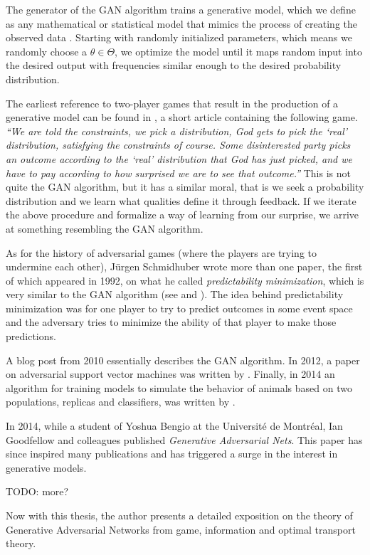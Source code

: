 The generator of the GAN algorithm trains a generative model, which we
define as any mathematical or statistical model that mimics the
process of creating the observed data \cite{ref:bishop}. Starting with
randomly initialized parameters, which means we randomly choose a
$\theta \in \Theta$, we optimize the model until it maps random input
into the desired output with frequencies similar enough to the desired
probability distribution.

The earliest reference to two-player games that result in the
production of a generative model can be found in \cite{ref:doyle}, a
short article containing the following game. \textit{``We are told the
constraints, we pick a distribution, God gets to pick the `real'
distribution, satisfying the constraints of course. Some disinterested
party picks an outcome according to the `real' distribution that God
has just picked, and we have to pay according to how surprised we are
to see that outcome.''} This is not quite the GAN algorithm, but it
has a similar moral, that is we seek a probability distribution and we
learn what qualities define it through feedback. If we iterate the
above procedure and formalize a way of learning from our surprise, we
arrive at something resembling the GAN algorithm.

As for the history of adversarial games (where the players are trying
to undermine each other), J\"{u}rgen Schmidhuber wrote more than one
paper, the first of which appeared in 1992, on what he called
\textit{predictability minimization}, which is very similar to the GAN
algorithm (see \cite{ref:schmidhuber-1992} and
\cite{ref:schmidhuber-2018}). The idea behind predictability
minimization was for one player to try to predict outcomes in some
event space and the adversary tries to minimize the ability of that
player to make those predictions.

A blog post from 2010 \cite{ref:niemitalo-2010} essentially describes the GAN
algorithm. In 2012, a paper on adversarial support vector machines was written
by \cite{ref:zhou-2012}. Finally, in 2014 an algorithm for training models to
simulate the behavior of animals based on two populations, replicas and
classifiers, was written by \cite{ref:li-2014}.

In 2014, while a student of Yoshua Bengio at the Universit\'{e} de
Montr\'{e}al, Ian Goodfellow and colleagues published
\textit{Generative Adversarial Nets}.  This paper has since inspired
many publications and has triggered a surge in the interest in
generative models.

TODO: more?

Now with this thesis, the author presents a detailed exposition on the theory of
Generative Adversarial Networks from game, information and optimal transport
theory.

